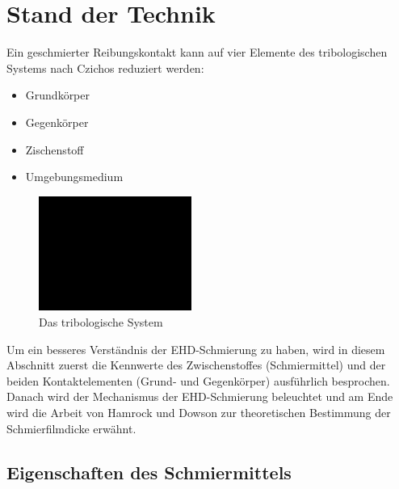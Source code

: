 \chapter{Stand der Technik}
\label{chap:stand_der_technik}

Ein geschmierter Reibungskontakt kann auf vier Elemente des tribologischen Systems nach Czichos\cite{czichos} reduziert werden:
\begin{itemize}
    \item Grundkörper
    \item Gegenkörper
    \item Zischenstoff
    \item Umgebungsmedium
\end{itemize}
\begin{figure}[htb]
    \centering
    \includegraphics[width=5cm]{./images/blank_img.jpg}
    \caption{Das tribologische System}
    \label{fig:das_tribologische_system}
\end{figure}

Um ein besseres Verständnis der EHD-Schmierung zu haben, wird in diesem Abschnitt zuerst die Kennwerte des Zwischenstoffes (Schmiermittel) und der beiden Kontaktelementen (Grund- und Gegenkörper) ausführlich besprochen.
Danach wird der Mechanismus der EHD-Schmierung beleuchtet und am Ende wird die Arbeit von Hamrock und Dowson zur theoretischen Bestimmung der Schmierfilmdicke erwähnt.

\section{Eigenschaften des Schmiermittels}
\label{sec:eigenschaften_des_schmiermittels}

